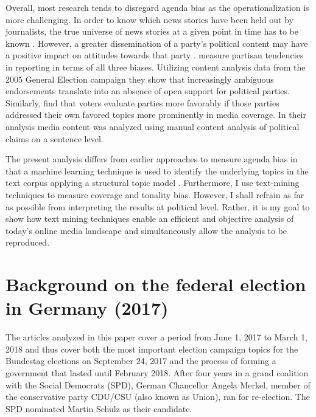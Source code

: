 \documentclass[12pt,a4paper,notitlepage]{article}
\begin{document}
Overall, most research tends to disregard agenda bias as the operationalization is more challenging. In order to know which news stories have been held out by journalists, the true universe of news stories at a given point in time has to be known \citet{dalessio_media_2000}. However, a greater dissemination of a party's political content may have a positive impact on attitudes towards that party \citep{benewick_floating_1969, eberl_one_2017}. \citet{brandenburg_party_2006} measure partisan tendencies in reporting in terms of all three biases. Utilizing content analysis data from the 2005 General Election campaign they show that increasingly ambiguous endorsements translate into an absence of open support for political parties. Similarly, \citet{eberl_one_2017} find that voters evaluate parties more favorably if those parties addressed their own favored topics more prominently in media coverage. In their analysis media content was analyzed using manual content analysis of political claims on a sentence level.

The present analysis differs from earlier approaches to measure agenda bias in that a machine learning technique is used to identify the underlying topics in the text corpus applying a structural topic model \citep{roberts_model_2016}. Furthermore, I use text-mining techniques to measure coverage and tonality bias. However, I shall refrain as far as possible from interpreting the results at political level. Rather, it is my goal to show how text mining techniques enable an efficient and objective analysis of today's online media landscape and simultaneously allow the analysis to be reproduced. 
 
\section{Background on the federal election in Germany (2017)}\label{ch_elections}

The articles analyzed in this paper cover a period from June 1, 2017 to March 1, 2018 and thus cover both the most important election campaign topics for the Bundestag elections on September 24, 2017 and the process of forming a government that lasted until February 2018. After four years in a grand coalition with the Social Democrats (SPD), German Chancellor Angela Merkel, member of the conservative party CDU/CSU (also known as Union), ran for re-election. The SPD nominated Martin Schulz as their candidate. 
\end{document}
